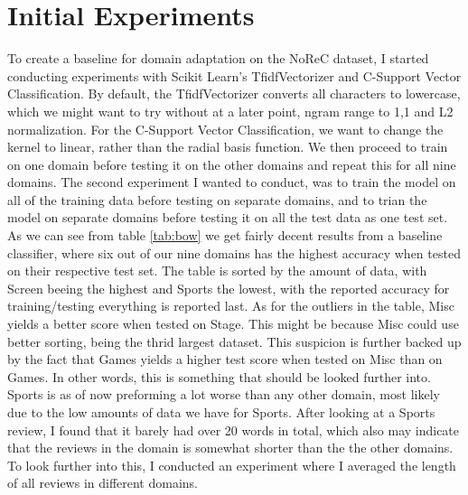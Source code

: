 \section{Initial Experiments}
To create a baseline for domain adaptation on the NoReC dataset, I started conducting experiments with Scikit Learn's TfidfVectorizer and C-Support Vector Classification. By default, the TfidfVectorizer converts all characters to lowercase, which we might want to try without at a later point, ngram range to 1,1 and L2 normalization. For the C-Support Vector Classification, we want to change the kernel to linear, rather than the radial basis function. We then proceed to train on one domain before testing it on the other domains and repeat this for all nine domains. The second experiment I wanted to conduct, was to train the model on all of the training data before testing on separate domains, and to trian the model on separate domains before testing it on all the test data as one test set. As we can see from table \ref{tab:bow} we get fairly decent results from a baseline classifier, where six out of our nine domains has the highest accuracy when tested on their respective test set. The table is sorted by the amount of data, with Screen beeing the highest and Sports the lowest, with the reported accuracy for training/testing everything is reported last. As for the outliers in the table, Misc yields a better score when tested on Stage. This might be because Misc could use better sorting, being the thrid largest dataset. This suspicion is further backed up by the fact that Games yields a higher test score when tested on Misc than on Games. In other words, this is something that should be looked further into. Sports is as of now preforming a lot worse than any other domain, most likely due to the low amounts of data we have for Sports. After looking at a Sports review, I found that it barely had over 20 words in total, which also may indicate that the reviews in the domain is somewhat shorter than the the other domains. To look further into this, I conducted an experiment where I averaged the length of all reviews in different domains.\\

